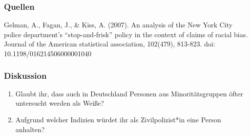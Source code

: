 \documentclass{beamer}
\begin{document}
	\begin{frame}
		\frametitle{Quellen}
		Gelman, A., Fagan, J., \& Kiss, A. (2007). An analysis of the New York City police department's 
		“stop-and-frisk” policy in the context of claims of racial bias. Journal of the American 
		statistical association, 102(479), 813-823. doi: 10.1198/016214506000001040
	\end{frame}
	\begin{frame}
		\frametitle{Diskussion}
		\begin{enumerate}
			\item<1> Glaubt ihr, dass auch in Deutschland Personen aus Minoritätsgruppen öfter untersucht werden als Weiße?
			\item<2> Aufgrund welcher Indizien würdet ihr als Zivilpolizist*in eine Person anhalten? 
		\end{enumerate}
	\end{frame}
\end{document}

